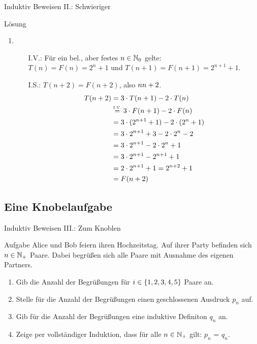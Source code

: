 \begin{frame}{Induktiv Beweisen II.: Schwieriger}
	\begin{block}{Lösung}
	\begin{enumerate}
		\setcounter{enumi}{\value{kevin}}
		\item
		\begin{itemize}
				\item[I.V.:] Für ein bel., aber festes $n \in \mathbb{N}_0$ gelte: \\
				 $T(n)=F(n)=2^n+1$ und $T(n+1)=F(n+1)=2^{n+1}+1$.
				\item[I.S.:] \zz $T(n+2) = F(n+2)$, also $n \notStephan{\leadsto} \Stephan{\curvearrowright} n+2$.
				\begin{align*}
					T(n+2) &= 3 \cdot T(n+1) - 2 \cdot T(n) \\
						   &\eqtext{I.V.} 3 \cdot F(n+1) - 2 \cdot F(n) \\
						   &= 3 \cdot (2^{n+1}+1) - 2 \cdot (2^n+1) \\
						   &= 3 \cdot 2^{n+1} + 3 - 2 \cdot 2^n - 2 \\
						   &= 3 \cdot 2^{n+1} - 2 \cdot 2^n + 1 \\
						   &= 3 \cdot 2^{n+1} - 2^{n+1} +1 \\
						   &= 2 \cdot 2^{n+1} + 1 = 2^{n+2} + 1 \\
						   &=F(n+2)
				\end{align*}
			\end{itemize}
		\end{enumerate}
	\end{block}
\end{frame}
\subsection{Eine Knobelaufgabe}
\begin{frame}{Induktiv Beweisen III.: Zum Knoblen}
	\begin{exampleblock}{Aufgabe}
		Alice und Bob feiern ihren Hochzeitstag. Auf ihrer Party befinden sich $n \in \mathbb{N}_+$ Paare. Dabei begrüßen sich alle Paare mit Ausnahme des eigenen Partners.\\
		\begin{enumerate}
			\item Gib die Anzahl der Begrüßungen für $i \in \{ 1,2,3,4,5 \}$ Paare an.
			\item Stelle für die Anzahl der Begrüßungen einen geschlossenen Ausdruck $p_n$ auf.
			\item Gib für die Anzahl der Begrüßungen eine induktive Definiton $q_n$ an.
			\item Zeige per vollständiger Induktion, dass für alle $n \in \mathbb{N}_+$ gilt: $p_n$ = $q_n$.
		\end{enumerate}
	\end{exampleblock}
\end{frame}

